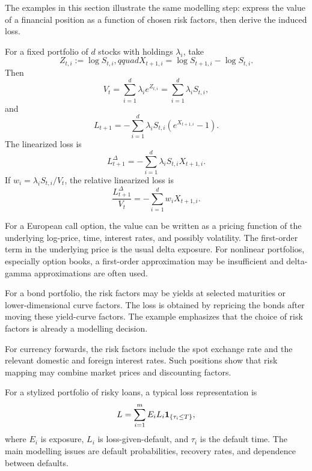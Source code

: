 The examples in this section illustrate the same modelling step: express the value of a financial position as a function of chosen risk factors, then derive the induced loss.

\begin{example}
For a fixed portfolio of $d$ stocks with holdings $\lambda_i$, take
\[
    Z_{t,i}:=\log S_{t,i},qquad
    X_{t+1,i}=\log S_{t+1,i}-\log S_{t,i}.
\]
Then
\[
    V_t=\sum_{i=1}^d \lambda_i e^{Z_{t,i}}
    =\sum_{i=1}^d \lambda_i S_{t,i},
\]
and
\[
    L_{t+1}
    =-\sum_{i=1}^d \lambda_i S_{t,i}(e^{X_{t+1,i}}-1).
\]
The linearized loss is
\[
    L_{t+1}^{\Delta}
    =-\sum_{i=1}^d \lambda_i S_{t,i}X_{t+1,i}.
\]
If $w_i=\lambda_iS_{t,i}/V_t$, the relative linearized loss is
\[
    \frac{L_{t+1}^{\Delta}}{V_t}
    =-\sum_{i=1}^d w_iX_{t+1,i}.
\]
\end{example}

\begin{example}
For a European call option, the value can be written as a pricing function of the underlying log-price, time, interest rates, and possibly volatility. The first-order term in the underlying price is the usual delta exposure. For nonlinear portfolios, especially option books, a first-order approximation may be insufficient and delta-gamma approximations are often used.
\end{example}

\begin{example}
For a bond portfolio, the risk factors may be yields at selected maturities or lower-dimensional curve factors. The loss is obtained by repricing the bonds after moving these yield-curve factors. The example emphasizes that the choice of risk factors is already a modelling decision.
\end{example}

\begin{example}
For currency forwards, the risk factors include the spot exchange rate and the relevant domestic and foreign interest rates. Such positions show that risk mapping may combine market prices and discounting factors.
\end{example}

\begin{example}
For a stylized portfolio of risky loans, a typical loss representation is
\[
    L=\sum_{i=1}^m E_i L_i\mathbf{1}_{\{\tau_i\le T\}},
\]
where $E_i$ is exposure, $L_i$ is loss-given-default, and $\tau_i$ is the default time. The main modelling issues are default probabilities, recovery rates, and dependence between defaults.
\end{example}

